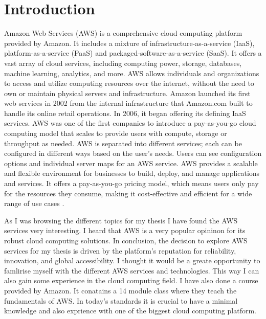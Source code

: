 \documentclass[11pt,a4paper,oneside]{report}
\begin{document}



\newpage
\tableofcontents
\pagebreak

\chapter{Introduction}

Amazon Web Services (AWS) is a comprehensive cloud computing platform provided by Amazon.
It includes a mixture of infrastructure-as-a-service (IaaS), platform-as-a-service (PaaS) and packaged-software-as-a-service (SaaS).
It offers a vast array of cloud services, including computing power, storage, databases, machine learning, analytics, and more.
AWS allows individuals and organizations to access and utilize computing resources over the internet, without the need to own or maintain physical servers and infrastructure.
Amazon launched its first web services in 2002 from the internal infrastructure that Amazon.com built to handle its online retail operations.
In 2006, it began offering its defining IaaS services. AWS was one of the first companies to introduce a pay-as-you-go cloud computing model that scales to provide users with compute, storage or throughput as needed.
AWS is separated into different services; each can be configured in different ways based on the user's needs.
Users can see configuration options and individual server maps for an AWS service.
AWS provides a scalable and flexible environment for businesses to build, deploy, and manage applications and services.
It offers a pay-as-you-go pricing model, which means users only pay for the resources they consume, making it cost-effective and efficient for a wide range of use cases \cite{techtagaws}.

As I was browsing the different topics for my thesis I have found the AWS services very interesting. I heard that AWS is a very popular opininon for its robust cloud computing solutions.
In conclusion, the decision to explore AWS services for my thesis is driven by the platform's reputation for reliability, innovation, and global accessibility. I thought it would be a greate opportunity to famlirise myself with the different AWS services and technologies.
This way I can also gain some experience in the cloud computing field. I have also done a course provided by Amazon. It conatains a 14 module class where they teach the fundamentals of AWS. In today's standards it is crucial to have a minimal knowledge and also exprience with one of the biggest cloud computing platform.
\end{document}

